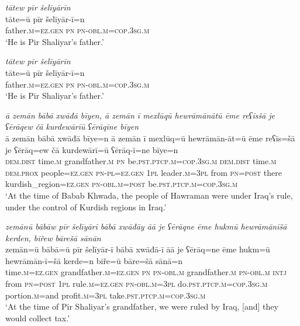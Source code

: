 \ea \label{BP.7}
\textit{tātew pīr šelīyārīn} \\ 
\gll tāte=ū pīr šelīyār-ī=n \\ 
 father\textsc{.m}\textsc{=ez.gen} \textsc{pn} \textsc{pn}\textsc{-obl}\textsc{.m}\textsc{=cop}\textsc{.3sg}\textsc{.m} \\ 
\glt `He is Pir Shaliyar’s father.'
\z 
 
\ea \label{BP.8}
\textit{tātew pīr šelīyārīn} \\ 
\gll tāte=ū pīr šelīyār-ī=n \\ 
 father\textsc{.m}\textsc{=ez.gen} \textsc{pn} \textsc{pn}\textsc{-obl}\textsc{.m}\textsc{=cop}\textsc{.3sg}\textsc{.m} \\ 
\glt `He is Pir Shaliyar’s father.'
\z 
 
\ea \label{BP.9}
\textit{ā zemān bābā xwāđā bīyen, ā zemān ī mexlūqū hewrāmānātū ēme reʕīsšā je ʕērāqew čā kurdewārīū ʕērāqīne bīyen} \\ 
\gll ā zemān bābā xwāđā bīye=n ā zemān ī mexlūq=ū hewrāmān-āt=ū ēme reʕīs=šā je ʕērāq=ew čā kurdewārī=ū ʕērāq-ī=ne bīye=n \\ 
 \textsc{dem.dist} time\textsc{.m} grandfather\textsc{.m} \textsc{pn} be\textsc{.pst}\textsc{.ptcp}\textsc{.m}\textsc{=cop}\textsc{.3sg}\textsc{.m} \textsc{dem.dist} time\textsc{.m} \textsc{dem.prox} people\textsc{=ez.gen} \textsc{pn}\textsc{\textsc{-pl}}\textsc{=ez.gen} \textsc{1pl} leader\textsc{.m}\textsc{=3pl} from \textsc{pn}\textsc{=\textsc{post}} there kurdish\_region\textsc{=ez.gen} \textsc{pn}\textsc{-obl}\textsc{.m}\textsc{=\textsc{post}} be\textsc{.pst}\textsc{.ptcp}\textsc{.m}\textsc{=cop}\textsc{.3sg}\textsc{.m} \\ 
\glt `At the time of Babab Khwada, the people of Hawraman were under Iraq’s rule, under the control of Kurdish regions in Iraq.'
\z 
 
\ea \label{BP.11}
\textit{zemānū bābāw pīr šelīyārī bābā xwāđāy āā je ʕērāqne ēme hukmū hewrāmānīšā kerden, biřew bārešā sānān} \\ 
\gll zemān=ū bābā=ū pīr šelīyār-ī bābā xwāđā-ī āā je ʕērāq=ne ēme hukm=ū hewrāmān-ī=šā kerde=n biře=ū bāre=šā sānā=n \\ 
 time\textsc{.m}\textsc{=ez.gen} grandfather\textsc{.m}\textsc{=ez.gen} \textsc{pn} \textsc{pn}\textsc{-obl}\textsc{.m} grandfather\textsc{.m} \textsc{pn}\textsc{-obl}\textsc{.m} \textsc{intj} from \textsc{pn}\textsc{=\textsc{post}} \textsc{1pl} rule\textsc{.m}\textsc{=ez.gen} \textsc{pn}\textsc{-obl}\textsc{.m}\textsc{=3pl} do\textsc{.pst}\textsc{.ptcp}\textsc{.m}\textsc{=cop}\textsc{.3sg}\textsc{.m} portion\textsc{.m}=and profit\textsc{.m}\textsc{=3pl} take\textsc{.pst}\textsc{.ptcp}\textsc{.m}\textsc{=cop}\textsc{.3sg}\textsc{.m} \\ 
\glt `At the time of Pir Shaliyar’s grandfather, we were ruled by Iraq, [and] they would collect tax.'
\z 
 
